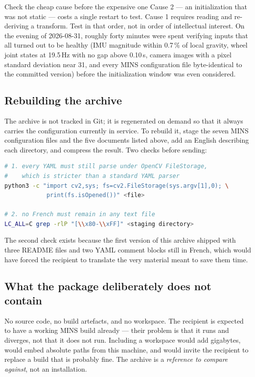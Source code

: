 \begin{trapbox}{Check the cheap cause before the expensive one}
Cause 2 --- an initialization that was not static --- costs a single restart to
test. Cause 1 requires reading and re-deriving a transform. Test in that order,
not in order of intellectual interest. On the evening of 2026-08-31, roughly
forty minutes were spent verifying inputs that all turned out to be healthy
(IMU magnitude within 0.7\,\% of local gravity, wheel joint states at
19.5\,Hz with no gap above 0.10\,s, camera images with a pixel standard
deviation near 31, and every MINS configuration file byte-identical to the
committed version) before the initialization window was even considered.
\end{trapbox}

\subsection{Rebuilding the archive}

The archive is not tracked in Git; it is regenerated on demand so that it always
carries the configuration currently in service. To rebuild it, stage the seven
MINS configuration files and the five documents listed above, add an English
 describing each directory, and compress the result. Two checks
before sending:

\begin{lstlisting}[language=bash]
# 1. every YAML must still parse under OpenCV FileStorage,
#    which is stricter than a standard YAML parser
python3 -c "import cv2,sys; fs=cv2.FileStorage(sys.argv[1],0); \
            print(fs.isOpened())" <file>

# 2. no French must remain in any text file
LC_ALL=C grep -rlP "[\\x80-\\xFF]" <staging directory>
\end{lstlisting}

\noindent The second check exists because the first version of this archive
shipped with three README files and two YAML comment blocks still in French,
which would have forced the recipient to translate the very material meant to
save them time.

\subsection{What the package deliberately does not contain}

No source code, no build artefacts, and no workspace. The recipient is expected
to have a working MINS build already --- their problem is that it runs and
diverges, not that it does not run. Including a workspace would add gigabytes,
would embed absolute paths from this machine, and would invite the recipient to
replace a build that is probably fine. The archive is a \emph{reference to
compare against}, not an installation.

